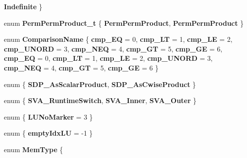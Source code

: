\begin{DoxyCompactItemize}
{\bfseries Indefinite}
 \}
\item 
\mbox{\label{namespace_eigen_1_1internal_a837e6488b526acf05536e7ebf64245b4}} 
enum {\bfseries Perm\+Perm\+Product\+\_\+t} \{ {\bfseries Perm\+Perm\+Product}, 
{\bfseries Perm\+Perm\+Product}
 \}
\item 
\mbox{\label{namespace_eigen_1_1internal_a11df3bc16c766c83507d4d59b6ef56e2}} 
enum {\bfseries Comparison\+Name} \{ \newline
{\bfseries cmp\+\_\+\+EQ} = 0, 
{\bfseries cmp\+\_\+\+LT} = 1, 
{\bfseries cmp\+\_\+\+LE} = 2, 
{\bfseries cmp\+\_\+\+U\+N\+O\+RD} = 3, 
\newline
{\bfseries cmp\+\_\+\+N\+EQ} = 4, 
{\bfseries cmp\+\_\+\+GT} = 5, 
{\bfseries cmp\+\_\+\+GE} = 6, 
{\bfseries cmp\+\_\+\+EQ} = 0, 
\newline
{\bfseries cmp\+\_\+\+LT} = 1, 
{\bfseries cmp\+\_\+\+LE} = 2, 
{\bfseries cmp\+\_\+\+U\+N\+O\+RD} = 3, 
{\bfseries cmp\+\_\+\+N\+EQ} = 4, 
\newline
{\bfseries cmp\+\_\+\+GT} = 5, 
{\bfseries cmp\+\_\+\+GE} = 6
 \}
\item 
\mbox{\label{namespace_eigen_1_1internal_a27c009289312eba4490fbef079357232}} 
enum \{ {\bfseries S\+D\+P\+\_\+\+As\+Scalar\+Product}, 
{\bfseries S\+D\+P\+\_\+\+As\+Cwise\+Product}
 \}
\item 
\mbox{\label{namespace_eigen_1_1internal_a6178600c33402f5f450d55f8e35c17f5}} 
enum \{ {\bfseries S\+V\+A\+\_\+\+Runtime\+Switch}, 
{\bfseries S\+V\+A\+\_\+\+Inner}, 
{\bfseries S\+V\+A\+\_\+\+Outer}
 \}
\item 
\mbox{\label{namespace_eigen_1_1internal_ad3af9548fff53ee9da3cb8967ef0688b}} 
enum \{ {\bfseries L\+U\+No\+Marker} = 3
 \}
\item 
\mbox{\label{namespace_eigen_1_1internal_aec3cb07cba529acd00ffe27322703277}} 
enum \{ {\bfseries empty\+Idx\+LU} = -\/1
 \}
\item 
\mbox{\label{namespace_eigen_1_1internal_a5ada550dfc9d36503a814391f7f68fc9}} 
enum {\bfseries Mem\+Type} \{ \newline

\end{DoxyCompactItemize}
